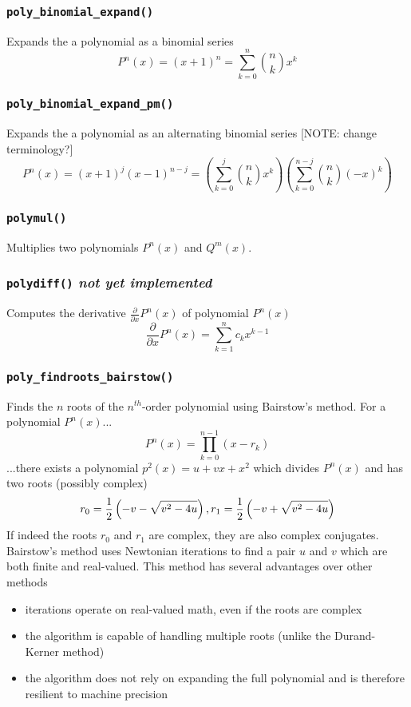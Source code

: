 \subsubsection{{\tt poly\_binomial\_expand()}}
Expands the a polynomial as a binomial series
\[
    P^n(x) = (x+1)^n = \sum_{k=0}^{n}{ {n \choose k} x^k}
\]

\subsubsection{{\tt poly\_binomial\_expand\_pm()}}
Expands the a polynomial as an alternating binomial series
[NOTE: change terminology?]
\[
    P^n(x) = (x+1)^j (x-1)^{n-j}
           = \left( \sum_{k=0}^{j}  { {n \choose k}    x^k} \right)
             \left( \sum_{k=0}^{n-j}{ {n \choose k} (-x)^k} \right)
\]

\subsubsection{{\tt polymul()}}
Multiplies two polynomials $P^n(x)$ and $Q^m(x)$.

\subsubsection{{\tt polydiff()} {\it not yet implemented}}
Computes the derivative $\frac{\partial}{\partial x}P^n(x)$ of polynomial
$P^n(x)$
\[
    \frac{\partial}{\partial x}P^n(x) = \sum_{k=1}^{n}{c_{k}x^{k-1}}
\]

\subsubsection{{\tt poly\_findroots\_bairstow()}}
Finds the $n$ roots of the $n^{th}$-order polynomial using Bairstow's method.
For a polynomial $P^n(x)$...
\[
    P^n(x) = \prod_{k=0}^{n-1}{(x-r_k)}
\]
...there exists a polynomial $p^{2}(x)=u + vx + x^2$ which divides
$P^{n}(x)$ and has two roots (possibly complex)
\[
    r_0 = \frac{1}{2}\left(-v-\sqrt{v^2-4u}\right), \; \\
    r_1 = \frac{1}{2}\left(-v+\sqrt{v^2-4u}\right)
\]
If indeed the roots $r_0$ and $r_1$ are complex, they are also complex
conjugates.
Bairstow's method uses Newtonian iterations to find a pair $u$ and $v$ which
are both finite and real-valued.
This method has several advantages over other methods
\begin{itemize}
\item iterations operate on real-valued math, even if the roots are complex
\item the algorithm is capable of handling multiple roots (unlike the
      Durand-Kerner method)
\item the algorithm does not rely on expanding the full polynomial and is
      therefore resilient to machine precision
\end{itemize}


